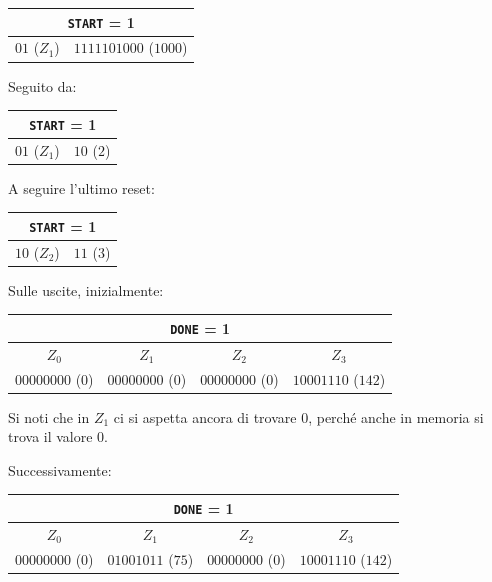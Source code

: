 \documentclass[a4paper,11pt]{article} %
\begin{document}
    \begin{tabular}{|c|c|}
        \hline
        \multicolumn{2}{|c|}{\texttt{START} = 1} \\
        \hline
        $01$ ($Z_1$) & $1111101000$ ($1000$) \\
        \hline
    \end{tabular}

    \medskip

    Seguito da:

    \smallskip

    \begin{tabular}{|c|c|}
        \hline
        \multicolumn{2}{|c|}{\texttt{START} = 1} \\
        \hline
        $01$ ($Z_1$) & $10$ ($2$) \\
        \hline
    \end{tabular}

    \medskip

    A seguire l'ultimo reset:
    \smallskip

    \begin{tabular}{|c|c|}
        \hline
        \multicolumn{2}{|c|}{\texttt{START} = 1} \\
        \hline
        $10$ ($Z_2$) & $11$ ($3$) \\
        \hline
    \end{tabular}

    \medskip

    Sulle uscite, inizialmente:
    \medskip

    \begin{tabular}{|c|c|c|c|}
        \hline
        \multicolumn{4}{|c|}{\texttt{DONE} = 1} \\
        \hline
        $Z_0$            & $Z_1$            & $Z_2$            & $Z_3$              \\
        \hline
        $00000000$ ($0$) & $00000000$ ($0$) & $00000000$ ($0$) & $10001110$ ($142$) \\
        \hline
    \end{tabular}

    \medskip

    Si noti che in $Z_1$ ci si aspetta ancora di trovare 0, perché anche in memoria si trova il valore 0.

    Successivamente:
    \medskip

    \begin{tabular}{|c|c|c|c|}
        \hline
        \multicolumn{4}{|c|}{\texttt{DONE} = 1} \\
        \hline
        $Z_0$            & $Z_1$             & $Z_2$            & $Z_3$              \\
        \hline
        $00000000$ ($0$) & $01001011$ ($75$) & $00000000$ ($0$) & $10001110$ ($142$) \\
        \hline
    \end{tabular}
\end{document}
